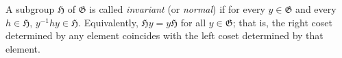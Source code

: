 A subgroup $\mathfrak{H}$ of $\mathfrak{G}$ is called \textit{invariant} (or \textit{normal}) if for every $y \in \mathfrak{G}$ and every $h \in \mathfrak{H}$, $y^{-1}hy \in \mathfrak{H}$. Equivalently, $\mathfrak{H}y = y\mathfrak{H}$ for all $y \in \mathfrak{G}$; that is, the right coset determined by any element coincides with the left coset determined by that element.
